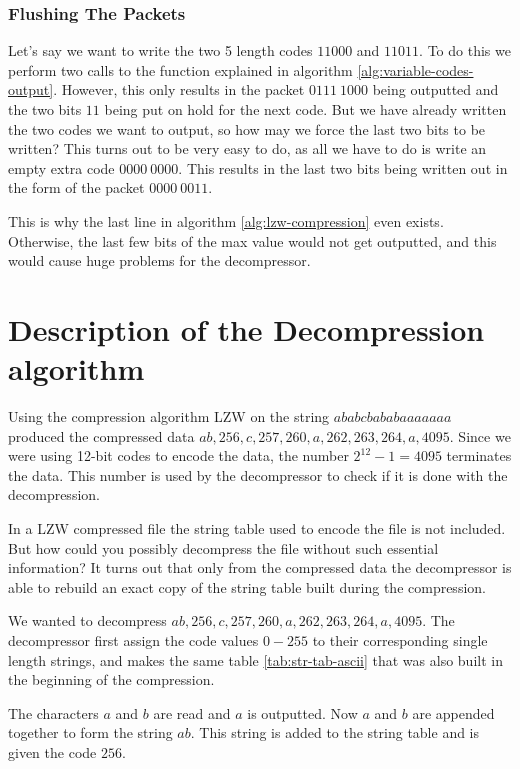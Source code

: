 \subsubsection{Flushing The Packets}

Let's say we want to write the two 5 length codes $11000$ and
$11011$. To do this we perform two calls to the function explained in
algorithm \ref{alg:variable-codes-output}. However, this only results
in the packet $0111 \ 1000$ being outputted and the two bits $11$
being put on hold for the next code. But we have already written the
two codes we want to output, so how may we force the last two bits to
be written?  This turns out to be very easy to do, as all we have to
do is write an empty extra code $0000 \ 0000$. This results in the
last two bits being written out in the form of the packet $0000 \
0011$.

This is why the last line in algorithm \ref{alg:lzw-compression} even
exists. Otherwise, the last few bits of the max value would not get
outputted, and this would cause huge problems for the decompressor.

\section{Description of the Decompression algorithm}

Using the compression algorithm LZW on the string $ababcbababaaaaaaa$
produced the compressed data $ab, 256,c, 257, 260, a, 262, 263, 264,
a,4095$. Since we were using 12-bit codes to encode the data, the
number $2^{12} - 1 = 4095$ terminates the data. This number is used by
the decompressor to check if it is done with the decompression.

In a LZW compressed file the string table used to encode the file is
not included. But how could you possibly decompress the file without
such essential information? It turns out that only from the compressed
data the decompressor is able to rebuild an exact copy of the string
table built during the compression.

We wanted to decompress $ab, 256,c, 257, 260, a, 262, 263, 264,
a,4095$. The decompressor first assign the code values $0-255$ to
their corresponding single length strings, and makes the same table
\ref{tab:str-tab-ascii} that was also built in the beginning of the
compression.

The characters $a$ and $b$ are read and $a$ is outputted. Now $a$ and
$b$ are appended together to form the string $ab$. This string is
added to the string table and is given the code $256$.

